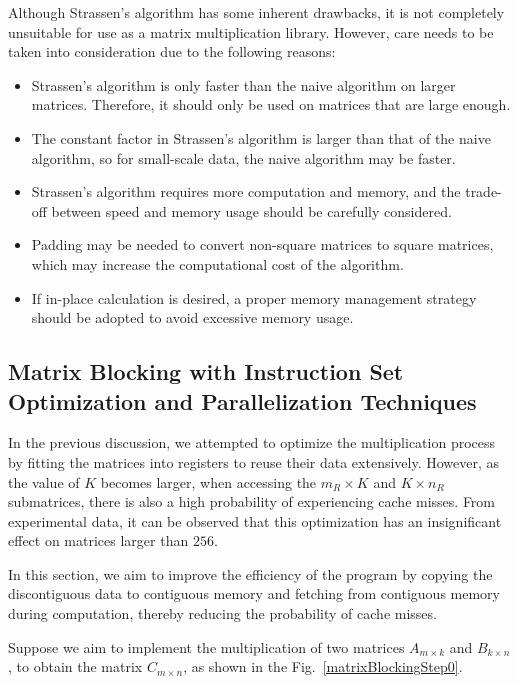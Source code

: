 \documentclass[conference]{IEEEtran}
\begin{document}
	 Although Strassen's algorithm has some inherent drawbacks, it is not completely unsuitable for use as a matrix multiplication library. However, care needs to be taken into consideration due to the following reasons:
	 
	\begin{itemize}
\item Strassen's algorithm is only faster than the naive algorithm on larger matrices. Therefore, it should only be used on matrices that are large enough.

\item The constant factor in Strassen's algorithm is larger than that of the naive algorithm, so for small-scale data, the naive algorithm may be faster.

\item Strassen's algorithm requires more computation and memory, and the trade-off between speed and memory usage should be carefully considered.

\item Padding may be needed to convert non-square matrices to square matrices, which may increase the computational cost of the algorithm.

\item If in-place calculation is desired, a proper memory management strategy should be adopted to avoid excessive memory usage.
	 \end{itemize}
	 
	 \subsection{Matrix Blocking with Instruction Set Optimization and Parallelization Techniques}
	 
	 In the previous discussion, we attempted to optimize the multiplication process by fitting the matrices into registers to reuse their data extensively. However, as the value of $K$ becomes larger, when accessing the $m_R \times K$ and $K \times n_R$ submatrices, there is also a high probability of experiencing cache misses. From experimental data, it can be observed that this optimization has an insignificant effect on matrices larger than $256$.
	 
	 In this section, we aim to improve the efficiency of the program by copying the discontiguous data to contiguous memory and fetching from contiguous memory during computation, thereby reducing the probability of cache misses.
	 
	 Suppose we aim to implement the multiplication of two matrices $A_{m \times k}$ and $B_{k \times n}$, to obtain the matrix $C_{m\times n}$, as shown in the Fig.~\ref{matrixBlockingStep0}.
	 
\end{document}
